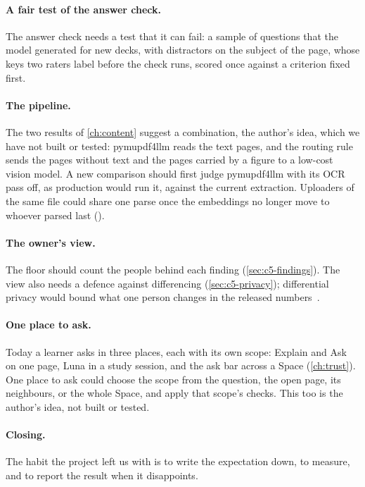 \paragraph{A fair test of the answer check.}
The answer check needs a test that it can fail: a sample of questions that
the model generated for new decks, with distractors on the subject of the
page, whose keys two raters label before the check runs, scored once against
a criterion fixed first.

\paragraph{The pipeline.}
The two results of \cref{ch:content} suggest a combination, the author's
idea, which we have not built or tested: pymu\-pdf4llm reads the text pages,
and the routing rule sends the pages without text and the pages carried by a
figure to a low-cost vision model. A new comparison should first judge
pymupdf4llm with its OCR pass off, as production would run it, against the
current extraction. Uploaders of the same file could share one parse once the
embeddings no longer move to whoever parsed last
().

\paragraph{The owner's view.}
The floor should count the people behind each finding
(\cref{sec:c5-findings}). The view also needs a defence against differencing
(\cref{sec:c5-privacy}); differential privacy would bound what one person
changes in the released numbers~\cite{dwork2006dp}.

\paragraph{One place to ask.}
Today a learner asks in three places, each with its own scope: Explain and
Ask on one page, Luna in a study session, and the ask bar across a Space
(\cref{ch:trust}). One place to ask could choose the scope from the question,
the open page, its neighbours, or the whole Space, and apply that scope's
checks. This too is the author's idea, not built or tested.

\paragraph{Closing.}
\label{sec:reflection}
The habit the project left us with is to write the expectation down, to
measure, and to report the result when it disappoints.
